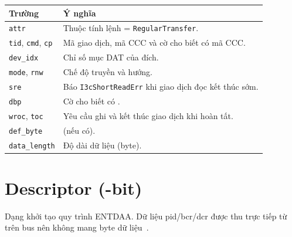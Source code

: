 \begin{longtable}{C{3.6cm} L{9.0cm}}
	\toprule
	\textbf{Trường}                         & \textbf{Ý nghĩa}                                                      \\
	\midrule
	\endhead
	\texttt{attr}                           & Thuộc tính lệnh = \texttt{RegularTransfer}.                           \\
	\texttt{tid}, \texttt{cmd}, \texttt{cp} & Mã giao dịch, mã CCC và cờ cho biết có mã CCC.                        \\
	\texttt{dev\_idx}                       & Chỉ số mục DAT của \Target{} đích.                                    \\
	\texttt{mode}, \texttt{rnw}             & Chế độ truyền và hướng.                                               \\
	\texttt{sre}                            & Báo \texttt{I3cShortReadErr} khi giao dịch đọc kết thúc sớm.          \\
	\texttt{dbp}                            & Cờ cho biết có \DefiningByte{}.                                       \\
	\texttt{wroc}, \texttt{toc}             & Yêu cầu ghi \ResponseDescriptor{} và kết thúc giao dịch khi hoàn tất. \\
	\texttt{def\_byte}                      & \DefiningByte{} (nếu có).                                             \\
	\texttt{data\_length}                   & Độ dài dữ liệu (byte).                                                \\
	\bottomrule
\end{longtable}

\section*{\AddressAssignment{} Descriptor (\CommandDescriptorWidth{}-bit)}

Dạng \AddressAssignment{} khởi tạo quy trình ENTDAA. Dữ liệu \gls{pid}/\gls{bcr}/\gls{dcr}
được thu trực tiếp từ \Target{} trên bus nên \CommandDescriptor{} không mang byte dữ liệu~\cite{mipi_i3c_tcri}.

